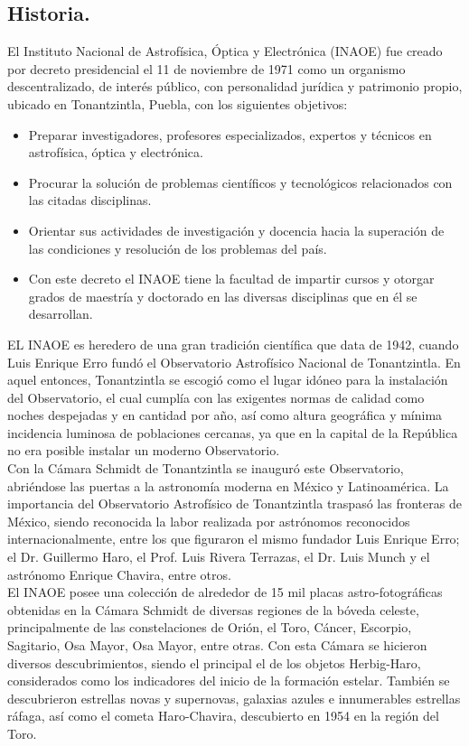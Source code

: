 \subsection{Historia.}
El Instituto Nacional de Astrofísica, Óptica y Electrónica (INAOE) fue creado por decreto presidencial el 11 de noviembre de 1971 como un organismo descentralizado, de interés público, con personalidad jurídica y patrimonio propio, ubicado en Tonantzintla, Puebla, con los siguientes objetivos:
\begin{itemize}
	\item Preparar investigadores, profesores especializados, expertos y técnicos en astrofísica, óptica y electrónica.
	\item Procurar la solución de problemas científicos y tecnológicos relacionados con las citadas disciplinas.
	\item Orientar sus actividades de investigación y docencia hacia la superación de las condiciones y resolución de los problemas del país.
	\item Con este decreto el INAOE tiene la facultad de impartir cursos y otorgar grados de maestría y doctorado en las diversas disciplinas que en él se desarrollan.
\end{itemize}

EL INAOE es heredero de una gran tradición científica que data de 1942, cuando Luis Enrique Erro fundó el Observatorio Astrofísico Nacional de Tonantzintla. En aquel entonces, Tonantzintla se escogió como el lugar idóneo para la instalación del Observatorio, el cual cumplía con las exigentes normas de calidad como noches despejadas y en cantidad por año, así como altura geográfica y mínima incidencia luminosa de poblaciones cercanas, ya que en la capital de la República no era posible instalar un moderno Observatorio.
\\

Con la Cámara Schmidt de Tonantzintla se inauguró este Observatorio, abriéndose las puertas a la astronomía moderna en México y Latinoamérica. La importancia del Observatorio Astrofísico de Tonantzintla traspasó las fronteras de México, siendo reconocida la labor realizada por astrónomos reconocidos internacionalmente, entre los que figuraron el mismo fundador Luis Enrique Erro; el Dr. Guillermo Haro, el Prof. Luis Rivera Terrazas, el Dr. Luis Munch y el astrónomo Enrique Chavira, entre otros.
\\
 
El INAOE posee una colección de alrededor de 15 mil placas astro-fotográficas obtenidas en la Cámara Schmidt de diversas regiones de la bóveda celeste, principalmente de las constelaciones de Orión, el Toro, Cáncer, Escorpio, Sagitario, Osa Mayor, Osa Mayor, entre otras. Con esta Cámara se hicieron diversos descubrimientos, siendo el principal el de los objetos Herbig-Haro, considerados como los indicadores del inicio de la formación estelar. También se descubrieron estrellas novas y supernovas, galaxias azules e innumerables estrellas ráfaga, así como el cometa Haro-Chavira, descubierto en 1954 en la región del Toro.
\\
  
